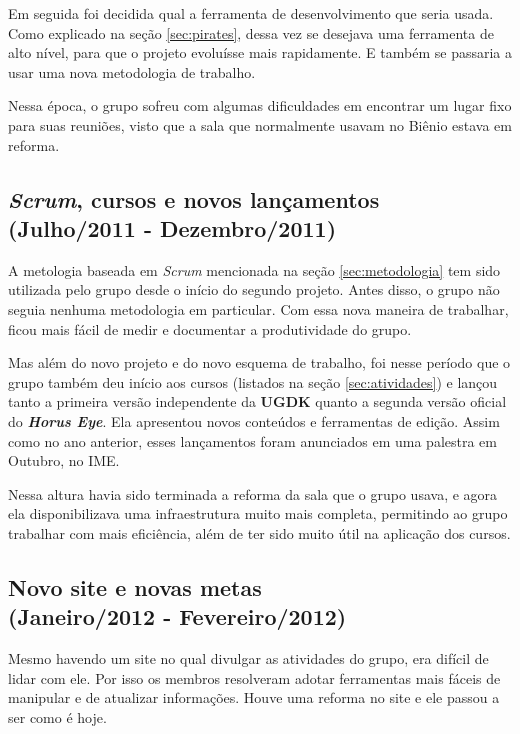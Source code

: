 \documentclass[12pt,onecolumn,a4paper]{article}
\begin{document}
        Em seguida foi decidida qual a ferramenta de desenvolvimento que seria usada. Como explicado
        na seção \ref{sec:pirates}, dessa vez se desejava uma ferramenta de alto nível, para que o
        projeto evoluísse mais rapidamente. E também se passaria a usar uma nova metodologia de
        trabalho.
        
        Nessa época, o grupo sofreu com algumas dificuldades em encontrar um lugar fixo para suas
        reuniões, visto que a sala que normalmente usavam no Biênio estava em reforma.

    \subsection{\textit{Scrum}, cursos e novos lançamentos \\
                {\small(Julho/2011 - Dezembro/2011)} }
        A metologia baseada em \textit{Scrum} mencionada na seção \ref{sec:metodologia} tem sido
        utilizada pelo grupo desde o início do segundo projeto. Antes disso, o grupo não seguia
        nenhuma metodologia em particular. Com essa nova maneira de trabalhar, ficou mais fácil de
        medir e documentar a produtividade do grupo.
        
        Mas além do novo projeto e do novo esquema de trabalho, foi nesse período que o grupo também
        deu início aos cursos (listados na seção \ref{sec:atividades}) e lançou tanto a primeira
        versão independente da \textbf{UGDK} quanto a segunda versão oficial do
        \textit{\textbf{Horus Eye}}. Ela apresentou novos conteúdos e ferramentas de edição. Assim
        como no ano anterior, esses lançamentos foram anunciados em uma palestra em Outubro, no IME.
        
        Nessa altura havia sido terminada a reforma da sala que o grupo usava, e agora ela
        disponibilizava uma infraestrutura muito mais completa, permitindo ao grupo trabalhar com
        mais eficiência, além de ter sido muito útil na aplicação dos cursos.

    \subsection{Novo site e novas metas \\
                {\small(Janeiro/2012 - Fevereiro/2012)} }
        Mesmo havendo um site no qual divulgar as atividades do grupo, era difícil de lidar com ele.
        Por isso os membros resolveram adotar ferramentas mais fáceis de manipular e de atualizar
        informações. Houve uma reforma no site e ele passou a ser como é hoje.
        
\end{document}
